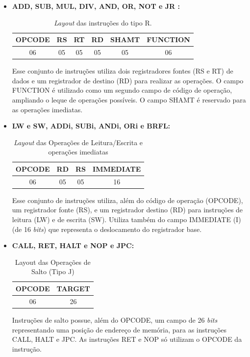 \documentclass{report}
\begin{document}
  \begin{itemize}
     
     \item \textbf{ADD, SUB, MUL, DIV, AND, OR, NOT e JR :}

  \begin{table}[H]
\centering
	\begin{tabular}{|c|c|c|c|c|c|}
  	\hline 
  	\textbf{OPCODE} & \textbf{RS} & \textbf{RT} & \textbf{RD} & \textbf{SHAMT} & \textbf{FUNCTION} \\ 
  	\hline 
  	06 & 05 & 05 & 05 & 05 & 06 \\ 
  	\hline 
  	\end{tabular} 
  	\caption{\textit{Layout} das instruções do tipo R.}
  \end{table}
  
  Esse conjunto de instruções utiliza dois registradores fontes (RS e RT) de dados e um registrador de destino (RD) para realizar as operações. O campo FUNCTION é utilizado como um segundo campo de código de operação, ampliando o leque de operações possíveis. O campo SHAMT é reservado para as operações imediatas.\\
  
   \item \textbf{LW e SW, ADDi, SUBi, ANDi, ORi e BRFL:}

  \begin{table}[H]
\centering
	\begin{tabular}{|c|c|c|c|}
  	\hline 
  	\textbf{OPCODE} & \textbf{RD} & \textbf{RS} & \textbf{IMMEDIATE}  \\ 
  	\hline 
  	06 & 05 & 05 & 16 \\ 
  	\hline 
  	\end{tabular} 
  	\caption{\textit{Layout} das Operações de Leitura/Escrita e operações imediatas}
  \end{table}
  
  Esse conjunto de instruções utiliza, além do código de operação (OPCODE), um registrador fonte (RS), e um registrador destino (RD) para instruções de leitura (LW) e de escrita (SW). Utiliza também do campo IMMEDIATE (I) (de 16 \textit{bits}) que representa o deslocamento do registrador base.\\

  
  \item \textbf{CALL, RET, HALT e NOP e JPC:}

  \begin{table}[H]
\centering
	\begin{tabular}{|c|c|}
  	\hline 
  	\textbf{OPCODE} & \textbf{TARGET} \\ 
  	\hline 
  	06 & 26 \\ 
  	\hline 
  	\end{tabular} 
  	\caption{Layout das Operações de Salto (Tipo J)}
  \end{table}
  
  Instruções de salto possue, além do OPCODE, um campo de 26 \textit{bits} representando uma posição de endereço de memória, para as instruções CALL, HALT e JPC. As instruções RET e NOP só utilizam o OPCODE da instrução.\\
  
  \end{itemize}
\end{document}

